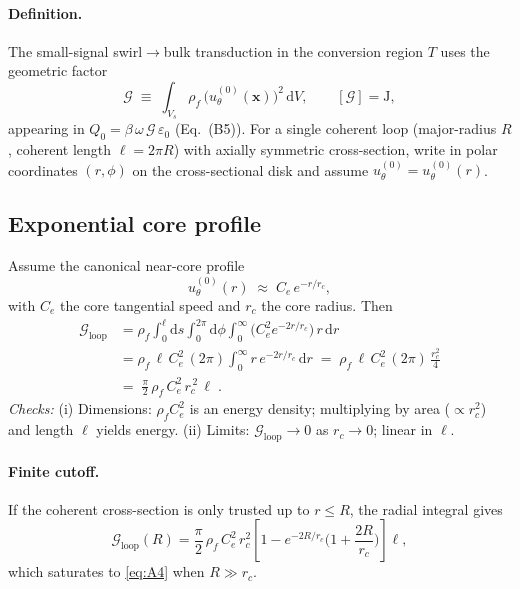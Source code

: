 \paragraph{Definition.}
    The small-signal swirl$\to$bulk transduction in the conversion region $T$ uses the geometric factor
    \begin{equation}
        \mathcal{G}\;\equiv\;\int_{V_s}\rho_f\,\big(u_\theta^{(0)}(\mathbf{x})\big)^2\,\mathrm{d}V,
        \qquad [\mathcal{G}]=\mathrm{J},
        \label{eq:A1}
    \end{equation}
    appearing in $Q_0=\beta\,\omega\,\mathcal{G}\,\varepsilon_0$ (Eq.~\textup{(B5)}). For a single coherent loop (major-radius $R$, coherent length $\ell=2\pi R$) with axially symmetric cross-section, write in polar coordinates $(r,\phi)$ on the cross-sectional disk and assume $u_\theta^{(0)}=u_\theta^{(0)}(r)$.

\subsection*{Exponential core profile}
Assume the canonical near-core profile
\begin{equation}
    u_\theta^{(0)}(r)\;\approx\;C_e\,e^{-r/r_c},
    \label{eq:A2}
\end{equation}
with $C_e$ the core tangential speed and $r_c$ the core radius. Then
\begin{align}
    \mathcal{G}_{\text{loop}}
    &= \rho_f \int_0^\ell\!\mathrm{d}s\!\int_0^{2\pi}\!\mathrm{d}\phi\!\int_0^\infty\!\big(C_e^2 e^{-2r/r_c}\big)\,r\,\mathrm{d}r
    \label{eq:A3}\\[3pt]
    &= \rho_f\,\ell\,C_e^2\,(2\pi)\int_0^\infty r\,e^{-2r/r_c}\,\mathrm{d}r
    \;=\; \rho_f\,\ell\,C_e^2\,(2\pi)\,\frac{r_c^2}{4}\nonumber\\[2pt]
    &=\boxed{\;\frac{\pi}{2}\,\rho_f\,C_e^2\,r_c^{\,2}\,\ell\;}.
    \label{eq:A4}
\end{align}
\emph{Checks:} (i) Dimensions: $\rho_f C_e^2$ is an energy density; multiplying by area ($\propto r_c^2$) and length $\ell$ yields energy. (ii) Limits: $\mathcal{G}_{\text{loop}}\to 0$ as $r_c\to 0$; linear in $\ell$.

\paragraph{Finite cutoff.}
    If the coherent cross-section is only trusted up to $r\le R$, the radial integral gives
    \begin{equation}
        \mathcal{G}_{\text{loop}}(R)
        =\frac{\pi}{2}\,\rho_f\,C_e^2\,r_c^2\!\left[1-e^{-2R/r_c}\!\Big(1+\frac{2R}{r_c}\Big)\right]\ell,
        \label{eq:A5}
    \end{equation}
    which saturates to \eqref{eq:A4} when $R\!\gg\! r_c$.

